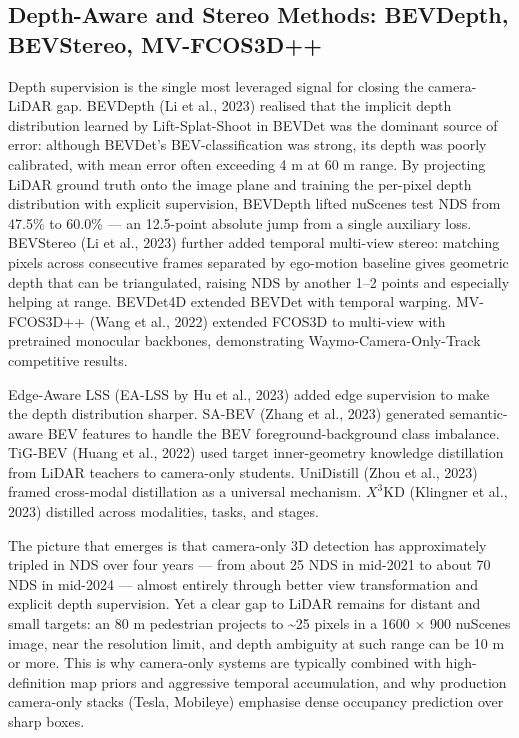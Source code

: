 \subsection{Depth-Aware and Stereo Methods: BEVDepth, BEVStereo, MV-FCOS3D++}\label{depth-aware-and-stereo-methods-bevdepth-bevstereo-mv-fcos3d}

Depth supervision is the single most leveraged signal for closing the camera-LiDAR gap. BEVDepth (Li et al., 2023) realised that the implicit depth distribution learned by Lift-Splat-Shoot in BEVDet was the dominant source of error: although BEVDet's BEV-classification was strong, its depth was poorly calibrated, with mean error often exceeding 4 m at 60 m range. By projecting LiDAR ground truth onto the image plane and training the per-pixel depth distribution with explicit supervision, BEVDepth lifted nuScenes test NDS from 47.5\% to 60.0\% --- an 12.5-point absolute jump from a single auxiliary loss. BEVStereo (Li et al., 2023) further added temporal multi-view stereo: matching pixels across consecutive frames separated by ego-motion baseline gives geometric depth that can be triangulated, raising NDS by another 1--2 points and especially helping at range. BEVDet4D extended BEVDet with temporal warping. MV-FCOS3D++ (Wang et al., 2022) extended FCOS3D to multi-view with pretrained monocular backbones, demonstrating Waymo-Camera-Only-Track competitive results.

Edge-Aware LSS (EA-LSS by Hu et al., 2023) added edge supervision to make the depth distribution sharper. SA-BEV (Zhang et al., 2023) generated semantic-aware BEV features to handle the BEV foreground-background class imbalance. TiG-BEV (Huang et al., 2022) used target inner-geometry knowledge distillation from LiDAR teachers to camera-only students. UniDistill (Zhou et al., 2023) framed cross-modal distillation as a universal mechanism. \(X^3\)KD (Klingner et al., 2023) distilled across modalities, tasks, and stages.

The picture that emerges is that camera-only 3D detection has approximately tripled in NDS over four years --- from about 25 NDS in mid-2021 to about 70 NDS in mid-2024 --- almost entirely through better view transformation and explicit depth supervision. Yet a clear gap to LiDAR remains for distant and small targets: an 80 m pedestrian projects to \textasciitilde25 pixels in a 1600 × 900 nuScenes image, near the resolution limit, and depth ambiguity at such range can be 10 m or more. This is why camera-only systems are typically combined with high-definition map priors and aggressive temporal accumulation, and why production camera-only stacks (Tesla, Mobileye) emphasise dense occupancy prediction over sharp boxes.

